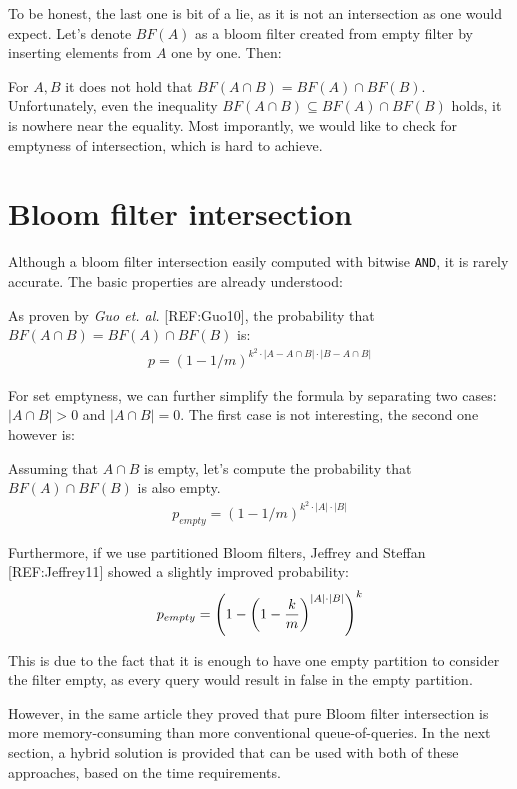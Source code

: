 To be honest, the last one is bit of a lie, as it is not an intersection as one
would expect. Let's denote $BF(A)$ as a bloom filter created from empty filter
by inserting elements from $A$ one by one. Then:

For $A,B$ it does not hold that $BF(A \cap B) = BF(A) \cap
BF(B)$. Unfortunately, even the inequality $BF(A \cap B) \subseteq BF(A) \cap
BF(B)$ holds, it is nowhere near the equality. Most imporantly, we would like to
check for emptyness of intersection, which is hard to achieve.

\section{Bloom filter intersection}

Although a bloom filter intersection easily computed with bitwise {\tt AND},
it is rarely accurate. The basic properties are already understood:

As proven by {\it Guo et. al.} [REF:Guo10], the probability that $BF(A\cap B) =
BF(A) \cap BF(B)$ is:
\begin{align}
p = (1-1/m)^{k^2\cdot |A-A\cap B| \cdot |B - A\cap B|}
\end{align}

For set emptyness, we can further simplify the formula by separating two cases:
$|A \cap B| > 0$ and $|A \cap B| = 0$. The first case is not interesting, the
second one however is:

Assuming that $A\cap B$ is empty, let's compute the probability that $BF(A) \cap
BF(B)$ is also empty.
\begin{align}
	p_{empty} = (1-1/m)^{k^2 \cdot |A| \cdot |B|}
\end{align}

Furthermore, if we use partitioned Bloom filters, Jeffrey and Steffan
[REF:Jeffrey11] showed a slightly improved probability:
\begin{align}
	p_{empty} = \left(1 - \left( 1 - {k \over m}\right)^{|A|\cdot |B|}\right)^k
\end{align}

This is due to the fact that it is enough to have one empty partition to consider
the filter empty, as every query would result in false in the empty partition.

However, in the same article they proved that pure Bloom filter intersection is more
memory-consuming than more conventional queue-of-queries. In the next section,
a hybrid solution is provided that can be used with both of these approaches,
based on the time requirements.

